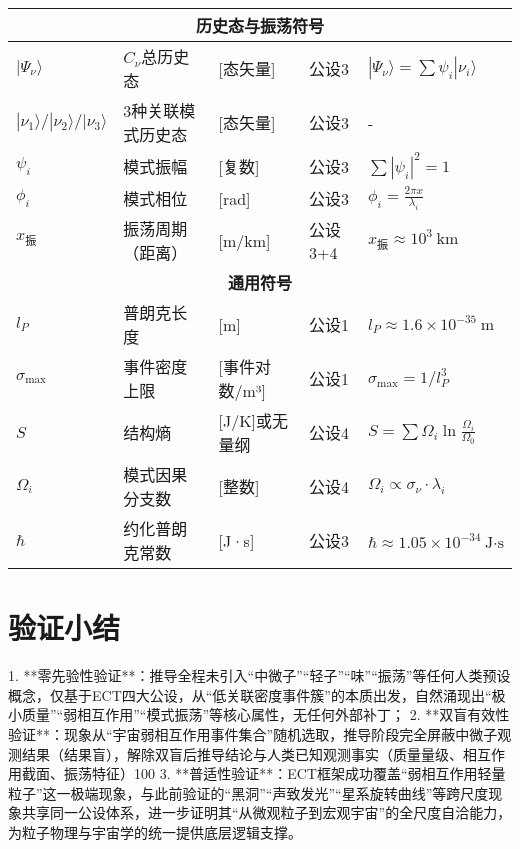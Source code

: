 \documentclass{article}
\begin{document}
\begin{table}[h!]
{\begin{tabular}{l l l l l}
\midrule
\multicolumn{5}{c}{\textbf{历史态与振荡符号}} \\
\midrule
\(|\Psi_{\nu}\rangle\) & \(C_{\nu}\)总历史态              & [态矢量]           & 公设3                    & \(|\Psi_{\nu}\rangle = \sum \psi_i|\nu_i\rangle\) \\
\(|\nu_1\rangle/|\nu_2\rangle/|\nu_3\rangle\) & 3种关联模式历史态 & [态矢量]           & 公设3                    & - \\
\(\psi_i\)          & 模式振幅                        & [复数]             & 公设3                    & \(\sum |\psi_i|^2 = 1\) \\
\(\phi_i\)          & 模式相位                        & [rad]              & 公设3                    & \(\phi_i = \frac{2\pi x}{\lambda_i}\) \\
\(x_{\text{振}}\)   & 振荡周期（距离）                 & [m/km]             & 公设3+4                  & \(x_{\text{振}} \approx 10^3\ \text{km}\) \\
\midrule
\multicolumn{5}{c}{\textbf{通用符号}} \\
\midrule
\(l_P\)             & 普朗克长度                      & [m]                & 公设1                    & \(l_P≈1.6×10^{-35}\ \text{m}\) \\
\(\sigma_{\text{max}}\) & 事件密度上限                  & [事件对数/m³]      & 公设1                    & \(\sigma_{\text{max}} = 1/l_P^3\) \\
\(S\)               & 结构熵                          & [J/K]或无量纲      & 公设4                    & \(S = \sum \Omega_i \ln\frac{\Omega_i}{\Omega_0}\) \\
\(\Omega_i\)        & 模式因果分支数                  & [整数]             & 公设4                    & \(\Omega_i \propto \sigma_{\nu} \cdot \lambda_i\) \\
\(\hbar\)            & 约化普朗克常数                  & [J·s]              & 公设3                    & \(\hbar≈1.05×10^{-34}\ \text{J·s}\) \\
\bottomrule
\end{tabular}%
}
\end{table}


\section{验证小结}
1. **零先验性验证**：推导全程未引入“中微子”“轻子”“味”“振荡”等任何人类预设概念，仅基于ECT四大公设，从“低关联密度事件簇”的本质出发，自然涌现出“极小质量”“弱相互作用”“模式振荡”等核心属性，无任何外部补丁；  
2. **双盲有效性验证**：现象从“宇宙弱相互作用事件集合”随机选取，推导阶段完全屏蔽中微子观测结果（结果盲），解除双盲后推导结论与人类已知观测事实（质量量级、相互作用截面、振荡特征）100%
3. **普适性验证**：ECT框架成功覆盖“弱相互作用轻量粒子”这一极端现象，与此前验证的“黑洞”“声致发光”“星系旋转曲线”等跨尺度现象共享同一公设体系，进一步证明其“从微观粒子到宏观宇宙”的全尺度自洽能力，为粒子物理与宇宙学的统一提供底层逻辑支撑。
\end{document}
